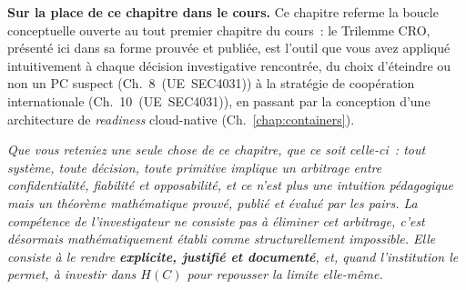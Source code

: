 \begin{boxinfo}
\textbf{Sur la place de ce chapitre dans le cours.} Ce chapitre
referme la boucle conceptuelle ouverte au tout premier chapitre
du cours~: le Trilemme CRO, présenté ici dans sa forme prouvée et
publiée, est l'outil que vous avez appliqué intuitivement à chaque
décision investigative rencontrée, du choix d'éteindre ou non
un PC suspect (Ch.~8~(UE~SEC4031)) à la stratégie de coopération
internationale (Ch.~10~(UE~SEC4031)), en passant par la
conception d'une architecture de \textit{readiness} cloud-native
(Ch.~\ref{chap:containers}).

\textit{Que vous reteniez une seule chose de ce chapitre, que ce
soit celle-ci~: tout système, toute décision, toute primitive
implique un arbitrage entre confidentialité, fiabilité et
opposabilité, et ce n'est plus une intuition pédagogique mais
un théorème mathématique prouvé, publié et évalué par les pairs.
La compétence de l'investigateur ne consiste pas à éliminer cet
arbitrage, c'est désormais mathématiquement établi comme
structurellement impossible. Elle consiste à le rendre
\textbf{explicite, justifié et documenté}, et, quand l'institution
le permet, à investir dans $H(C)$ pour repousser la limite elle-même.}
\end{boxinfo}

